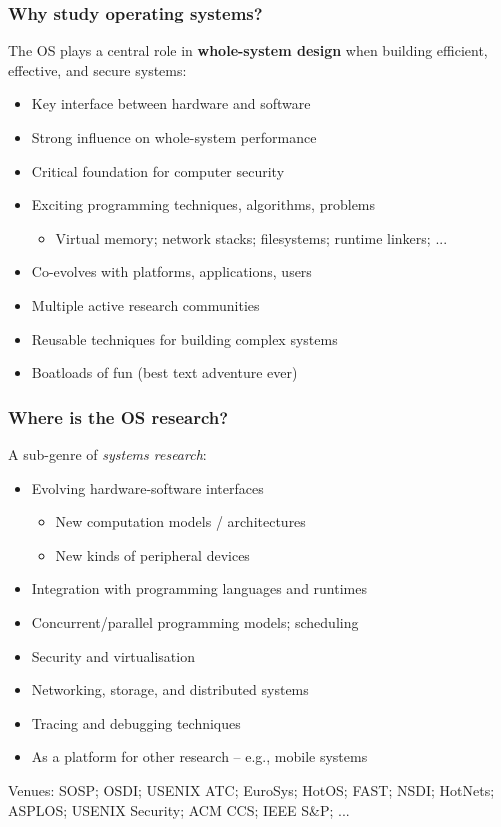 \begin{frame}
  \frametitle{Why study operating systems?}

  \bigskip

  The OS plays a central role in \textbf{whole-system design}  when building
  efficient, effective, and secure systems:

  \bigskip

  \begin{itemize}
    \item Key interface between hardware and software
    \item Strong influence on whole-system performance
    \item Critical foundation for computer security
    \item Exciting programming techniques, algorithms, problems
    \begin{itemize}
      \item Virtual memory; network stacks; filesystems; runtime linkers; ...
    \end{itemize}
    \item Co-evolves with platforms, applications, users
    \item Multiple active research communities
    \item Reusable techniques for building complex systems
    \item Boatloads of fun (best text adventure ever)
  \end{itemize}
\end{frame}

\begin{frame}
  \frametitle{Where is the OS research?}

  \bigskip
  A sub-genre of \textit{systems research}:
  \bigskip

  \begin{itemize}
    \item Evolving hardware-software interfaces
    \begin{itemize}
      \item New computation models / architectures
      \item New kinds of peripheral devices
    \end{itemize}
    \item Integration with programming languages and runtimes
    \item Concurrent/parallel programming models; scheduling
    \item Security and virtualisation
    \item Networking, storage, and distributed systems
    \item Tracing and debugging techniques
    \item As a platform for other research -- e.g., mobile systems
  \end{itemize}

  \pause
  \bigskip
  Venues: SOSP; OSDI; USENIX ATC; EuroSys; HotOS; FAST; NSDI; HotNets;
  ASPLOS; USENIX Security; ACM CCS; IEEE S\&P; ...
\end{frame}

